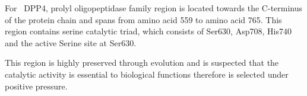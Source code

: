 For~ DPP4, prolyl oligopeptidase family region is located towards the C-terminus of the protein chain and spans from amino acid 559 to amino acid 765. This region contains serine catalytic triad, which consists of Ser630, Asp708, His740 and the active Serine site at Ser630. \par
This region is highly preserved through evolution and is suspected that the catalytic activity is essential to biological functions  therefore is selected under positive pressure. 